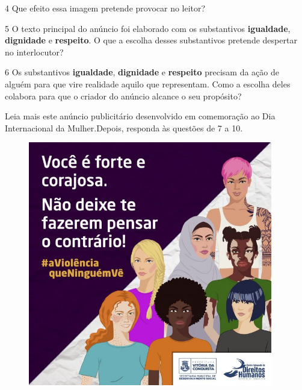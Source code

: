 \num{4} Que efeito essa imagem pretende provocar no leitor?


\num{5} O texto principal do anúncio foi elaborado com os substantivos
\textbf{igualdade}, \textbf{dignidade} e \textbf{respeito}. O que a
escolha desses substantivos pretende despertar no interlocutor?


\num{6} Os substantivos \textbf{igualdade}, \textbf{dignidade} e
\textbf{respeito} precisam da ação de alguém para que vire realidade
aquilo que representam. Como a escolha deles colabora para que o criador
do anúncio alcance o seu propósito?


Leia mais este anúncio publicitário desenvolvido em comemoração ao Dia
Internacional da Mulher.Depois, responda às questões de 7 a 10.


\begin{figure}
\centering
\includegraphics[width=4.19722in,height=4.19722in]{./_SAEB_9_POR/media/image21.jpeg}
\end{figure}

